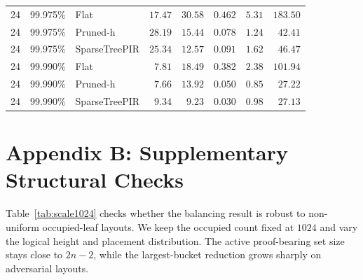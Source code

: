 \begin{table}[H]
{\begin{tabular}{cclrrrrr}
24 & 99.975\% & Flat & $17.47$ & $30.58$ & $0.462$ & $5.31$ & $183.50$ \\
24 & 99.975\% & Pruned-h & $28.19$ & $15.44$ & $0.078$ & $1.24$ & $42.41$ \\
24 & 99.975\% & SparseTreePIR & $25.34$ & $12.57$ & $0.091$ & $1.62$ & $46.47$ \\
24 & 99.990\% & Flat & $7.81$ & $18.49$ & $0.382$ & $2.38$ & $101.94$ \\
24 & 99.990\% & Pruned-h & $7.66$ & $13.92$ & $0.050$ & $0.85$ & $27.22$ \\
24 & 99.990\% & SparseTreePIR & $9.34$ & $9.23$ & $0.030$ & $0.98$ & $27.13$ \\
\bottomrule
\end{tabular}
\par}
\end{table}

\section*{Appendix B: Supplementary Structural Checks}
\label{app:structural-checks}

Table~\ref{tab:scale1024} checks whether the balancing result is robust to non-uniform occupied-leaf layouts. We keep the occupied count fixed at $1024$ and vary the logical height and placement distribution. The active proof-bearing set size stays close to $2n-2$, while the largest-bucket reduction grows sharply on adversarial layouts.

\begin{table}[H]
\centering
\caption{Distribution stress test with $1024$ occupied leaves}
\label{tab:scale1024}
\scriptsize
\setlength{\tabcolsep}{3pt}
\end{table}

